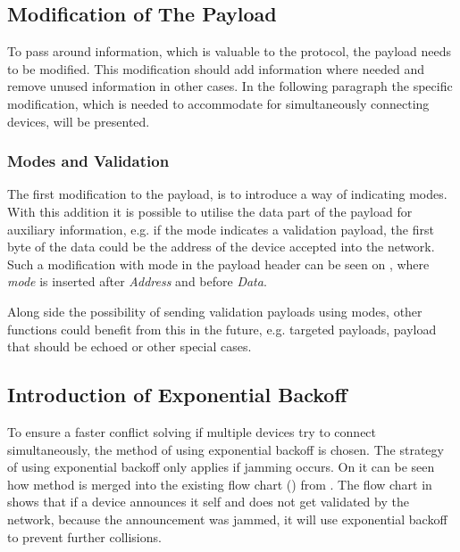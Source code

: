 \subsection{Modification of The Payload} %
\label{sub:modification_of_the_payload}
To pass around information, which is valuable to the protocol, the payload needs to be modified.
This modification should add information where needed and remove unused information in other cases.
In the following paragraph the specific modification, which is needed to accommodate for simultaneously connecting devices, will be presented. 

\subsubsection{Modes and Validation} %
\label{ssub:modes_and_validation}
The first modification to the payload, is to introduce a way of indicating modes.
With this addition it is possible to utilise the data part of the payload for auxiliary information, e.g. if the mode indicates a validation payload, the first byte of the data could be the address of the device accepted into the network.
Such a modification with mode in the payload header can be seen on , where \emph{mode} is inserted after \emph{Address} and before \emph{Data}. 


\noindent
Along side the possibility of sending validation payloads using modes, other functions could benefit from this in the future, e.g. targeted payloads, payload that should be echoed or other special cases.


\subsection{Introduction of Exponential Backoff} %
\label{sub:introduction_of_sub_slots_and_exponential_backoff}
To ensure a faster conflict solving if multiple devices try to connect simultaneously, the method of using exponential backoff is chosen.
The strategy of using exponential backoff only applies if jamming occurs.
On  it can be seen how method is merged into the existing flow chart () from .
The flow chart in  shows that if a device announces it self and does not get validated by the network, because the announcement was jammed, it will use exponential backoff to prevent further collisions.  

